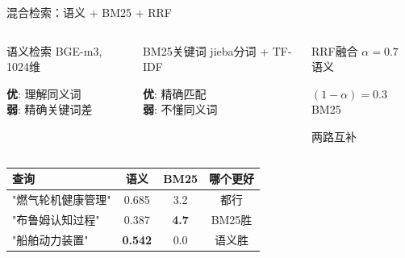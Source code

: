 \documentclass[aspectratio=169,11pt]{beamer}
\begin{document}
\begin{frame}{混合检索：语义 + BM25 + RRF}
\begin{columns}[T]
\begin{block}{\faProjectDiagram\; 语义检索}
BGE-m3, 1024维

\smallskip
{\small
\textbf{优}: 理解同义词\\
\textbf{弱}: 精确关键词差
}
\end{block}

\begin{block}{\faSearch\; BM25关键词}
jieba分词 + TF-IDF

\smallskip
{\small
\textbf{优}: 精确匹配\\
\textbf{弱}: 不懂同义词
}
\end{block}

\begin{exampleblock}{\faMagic\; RRF融合}
$\alpha{=}0.7$ 语义

$(1{-}\alpha){=}0.3$ BM25

两路互补
\end{exampleblock}
\end{columns}

\vspace{3mm}
\begin{center}
\begin{tabular}{lccc}
\toprule
\textbf{查询} & \textbf{语义} & \textbf{BM25} & \textbf{哪个更好} \\
\midrule
"燃气轮机健康管理" & 0.685 & 3.2 & 都行 \\
"布鲁姆认知过程" & {\color{badred}0.387} & {\color{goodgreen}\textbf{4.7}} & BM25胜 \\
"船舶动力装置" & {\color{goodgreen}\textbf{0.542}} & {\color{badred}0.0} & 语义胜 \\
\bottomrule
\end{tabular}
\end{center}
\end{frame}
\end{document}
